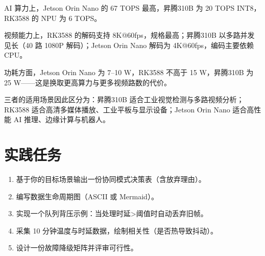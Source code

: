 AI 算力上，Jetson Orin Nano 的 67 TOPS 最高，昇腾310B 为 20 TOPS
INT8，RK3588 的 NPU 为 6 TOPS。

视频能力上，RK3588 的解码支持 8K@60fps，规格最高；昇腾310B
以多路并发见长（40 路 1080P 解码）；Jetson Orin Nano 解码为
4K@60fps，编码主要依赖 CPU。

功耗方面，Jetson Orin Nano 为 7--10 W，RK3588 不高于 15 W，昇腾310B 为
25 W------这是换取更高算力与更多视频路数的代价。

三者的适用场景因此区分为：昇腾310B
适合工业视觉检测与多路视频分析；RK3588
适合高清多媒体播放、工业平板与显示设备；Jetson Orin Nano 适合高性能 AI
推理、边缘计算与机器人。

\section{实践任务}\label{src-book-chapter1-h14}

\begin{enumerate}
\def\labelenumi{\arabic{enumi}.}
\tightlist
\item
  基于你的目标场景输出一份协同模式决策表（含放弃理由）。
\item
  编写数据生命周期图（ASCII 或 Mermaid）。
\item
  实现一个队列背压示例：当处理时延\textgreater 阈值时自动丢弃旧帧。
\item
  采集 10 分钟温度与时延数据，绘制相关性（是否热导致抖动）。
\item
  设计一份故障降级矩阵并评审可行性。
\end{enumerate}
